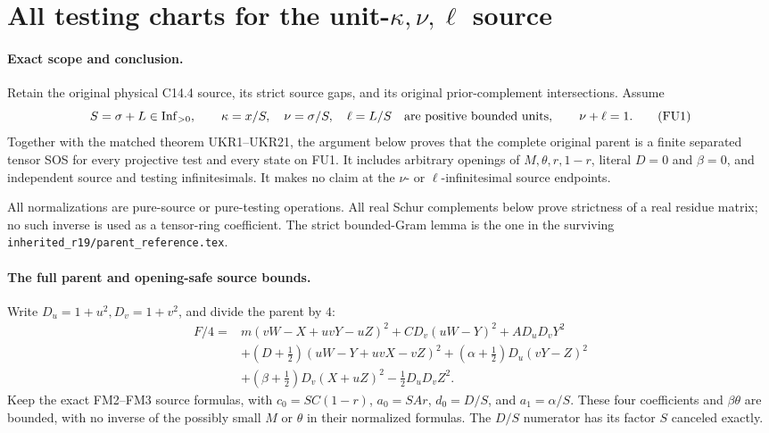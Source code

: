 \section{All testing charts for the unit-$\kappa,\nu,\ell$ source}
\label{sec:new-c144-unit-kappa-all-tests}

\paragraph{Exact scope and conclusion.}
Retain the original physical C14.4 source, its strict source gaps,
and its original prior-complement intersections. Assume
\[
 S=\sigma+L\in\operatorname{Inf}_{>0},\qquad
 \kappa=x/S,\quad\nu=\sigma/S,\quad\ell=L/S
 \quad\hbox{are positive bounded units},\qquad\nu+\ell=1.
 \tag{FU1}
\]
Together with the matched theorem UKR1--UKR21, the argument below
proves that the complete original parent is a finite separated tensor
SOS for every projective test and every state on FU1. It includes
arbitrary openings of $M,\theta,r,1-r$, literal $D=0$ and $\beta=0$,
and independent source and testing infinitesimals. It makes no claim
at the $\nu$- or $\ell$-infinitesimal source endpoints.

All normalizations are pure-source or pure-testing operations.
All real Schur complements below prove strictness of a real residue
matrix; no such inverse is used as a tensor-ring coefficient. The
strict bounded-Gram lemma is the one in the surviving
\texttt{inherited\_r19/parent\_reference.tex}.

\paragraph{The full parent and opening-safe source bounds.}
Write $D_u=1+u^2,D_v=1+v^2$, and divide the parent by $4$:
\[
\begin{split}
 F/4={}&m(vW-X+uvY-uZ)^2+CD_v(uW-Y)^2+AD_uD_vY^2\\
 &+(D+\tfrac12)(uW-Y+uvX-vZ)^2
 +(\alpha+\tfrac12)D_u(vY-Z)^2\\
 &+(\beta+\tfrac12)D_v(X+uZ)^2-\tfrac12D_uD_vZ^2.
\end{split}\tag{FU2}
\]
Keep the exact FM2--FM3 source formulas, with
$c_0=SC(1-r)$, $a_0=SAr$, $d_0=D/S$, and $a_1=\alpha/S$.
These four coefficients and $\beta\theta$ are bounded, with no
inverse of the possibly small $M$ or $\theta$ in their normalized
formulas. The $D/S$ numerator has its factor $S$ canceled exactly.

